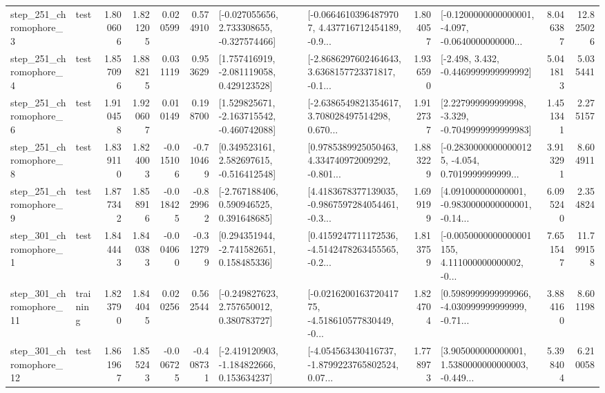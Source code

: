 \begin{tabular}{llrrrrllrlrr}
   step\_251\_chromophore\_3 &      test &      1.800606 &    1.821205 &      0.020599 &  0.574910 &   [-0.027055656, 2.733308655, -0.327574466] &  [-0.06646103964879707, 4.437716712454189, -0.9... &       1.804057 &  [-0.1200000000000001, -4.097, -0.0640000000000... &            8.046387 &         12.825026 \\
   step\_251\_chromophore\_4 &      test &      1.857096 &    1.888215 &      0.031119 &  0.953629 &    [1.757416919, -2.081119058, 0.429123528] &  [-2.8686297602464643, 3.6368157723371817, -0.1... &       1.936590 &               [-2.498, 3.432, -0.4469999999999992] &            5.041813 &          5.035441 \\
   step\_251\_chromophore\_6 &      test &      1.910458 &    1.920607 &      0.010149 &  0.198700 &   [1.529825671, -2.163715542, -0.460742088] &  [-2.6386549821354617, 3.708028497514298, 0.670... &       1.912737 &   [2.227999999999998, -3.329, -0.7049999999999983] &            1.451341 &          2.275157 \\
   step\_251\_chromophore\_8 &      test &      1.839110 &    1.824003 &     -0.015106 & -0.710469 &    [0.349523161, 2.582697615, -0.516412548] &  [0.9785389925050463, 4.334740972009292, -0.801... &       1.883229 &  [-0.28300000000000125, -4.054, 0.7019999999999... &            3.913291 &          8.604911 \\
   step\_251\_chromophore\_9 &      test &      1.877342 &    1.858916 &     -0.018425 & -0.829962 &    [-2.767188406, 0.590946525, 0.391648685] &  [4.4183678377139035, -0.9867597284054461, -0.3... &       1.699199 &  [4.091000000000001, -0.9830000000000001, -0.14... &            6.095240 &          2.354824 \\
   step\_301\_chromophore\_1 &      test &      1.844443 &    1.840383 &     -0.004060 & -0.312799 &    [0.294351944, -2.741582651, 0.158485336] &  [0.4159247711172536, -4.5142478263455565, -0.2... &       1.813759 &  [-0.0050000000000001155, 4.111000000000002, -0... &            7.651547 &         11.799158 \\
  step\_301\_chromophore\_11 &  training &      1.823790 &    1.844045 &      0.020256 &  0.562544 &    [-0.249827623, 2.757650012, 0.380783727] &  [-0.021620016372041775, -4.518610577830449, -0... &       1.824704 &  [0.5989999999999966, -4.030999999999999, -0.71... &            3.884160 &          8.601198 \\
  step\_301\_chromophore\_12 &      test &      1.861967 &    1.855243 &     -0.006725 & -0.408731 &   [-2.419120903, -1.184822666, 0.153634237] &  [-4.054563430416737, -1.8799223765802524, 0.07... &       1.778973 &  [3.905000000000001, 1.5380000000000003, -0.449... &            5.398404 &          6.210058 \\

\end{tabular}
